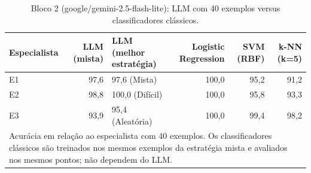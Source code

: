 \begin{table}[htbp]
\centering
\small
\caption{Bloco 2 (google/gemini-2.5-flash-lite): LLM com 40 exemplos versus classificadores clássicos.}
\label{tab:bloco2_E_LLM_vs_baselines_40shot_flashlite}
\begin{tabular}{lrlrrr}
\toprule
Especialista & LLM (mista) & LLM (melhor estratégia) & Logistic Regression & SVM (RBF) & k-NN (k=5) \\
\midrule
E1 & 97,6 & 97,6 (Mista) & 100,0 & 95,2 & 91,2 \\
E2 & 98,8 & 100,0 (Difícil) & 100,0 & 95,8 & 93,3 \\
E3 & 93,9 & 95,4 (Aleatória) & 100,0 & 99,4 & 98,2 \\
\bottomrule
\multicolumn{6}{p{0.95\linewidth}}{\footnotesize Acurácia em relação ao especialista com 40 exemplos. Os classificadores clássicos são treinados nos mesmos exemplos da estratégia mista e avaliados nos mesmos pontos; não dependem do LLM.} \\
\end{tabular}
\end{table}
